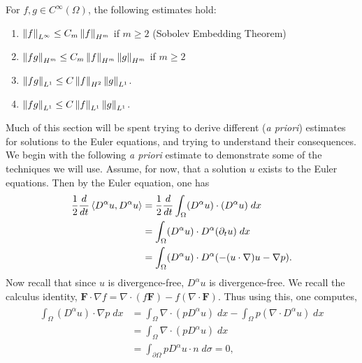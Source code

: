 \documentclass{article}
\begin{document}
\begin{prop}
	For $f, g \in C^{\infty}(\Omega)$, the following estimates hold: \vspace{-0.25cm}
	\begin{enumerate}[itemsep =-2pt,label = (\roman{*})]
		\item $\left\Vert f \right\Vert_{L^{\infty}} \leq C_{m}\left\Vert f \right\Vert_{H^{m}}$ if $m \geq 2$ (Sobolev Embedding Theorem) 
		\item $\left\Vert fg \right\Vert_{H^{m}} \leq C_{m}\left\Vert f \right\Vert_{H^{m}}\left\Vert g \right\Vert_{H^{m}}$  if $m \geq 2$ 
		\item $\left\Vert fg \right\Vert_{L^{1}} \leq C\left\Vert f \right\Vert_{H^{2}}\left\Vert g \right\Vert_{L^{1}}$. 
		\item $\left\Vert fg \right\Vert_{L^{1}} \leq C\left\Vert f \right\Vert_{L^{1}}\left\Vert g \right\Vert_{L^{1}}$. 
	\end{enumerate}
	\label{eq:useful_inequals_euler}
\end{prop} 
Much of this section will be spent trying to derive different (\textit{a priori}) estimates for solutions to the Euler equations, and trying to understand their consequences. We begin with the following \textit{a priori} estimate to demonstrate some of the techniques we will use. Assume, for now, that a solution $u$ exists to the Euler equations. Then by the Euler equation, one has 
\begin{align*}
	\begin{split}
		\frac{1}{2}\frac{d}{dt}\braket{D^{\alpha}u, D^{\alpha}u} &= \frac{1}{2}\frac{d}{dt}\int_{\Omega} (D^{\alpha}u) \cdot (D^{\alpha}u)\;dx \\
		&= \int_{\Omega}(D^{\alpha}u) \cdot D^{\alpha}(\partial_{t}u)\;dx \\
		&= \int_{\Omega}(D^{\alpha}u) \cdot D^{\alpha}(-(u \cdot \nabla)u - \nabla p). 
	\end{split} 
\end{align*} 
Now recall that since $u$ is divergence-free, $D^{\alpha}u$ is divergence-free. We recall the calculus identity, $\mathbf{F} \cdot \nabla f = \nabla \cdot (f\mathbf{F}) - f(\nabla \cdot \mathbf{F})$. Thus using this, one computes,  
\begin{align*}
	\begin{split}
		\int_{\Omega}(D^{\alpha}u) \cdot \nabla p\;dx &= \int_{\Omega}\nabla \cdot (pD^{\alpha}u)\;dx - \int_{\Omega} p (\nabla \cdot D^{\alpha}u)\;dx \\
		&= \int_{\Omega}\nabla \cdot (pD^{\alpha}u)\;dx\\
		& = \int_{\partial \Omega} pD^{\alpha}u \cdot n\;d\sigma = 0, 
	\end{split} 
\end{align*}
\end{document}
